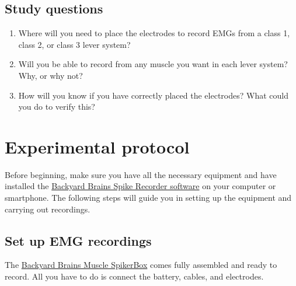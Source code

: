 \documentclass{article}
\begin{document}
\subsection{Study questions}

\begin{enumerate}
\item Where will you need to place the electrodes to record EMGs from a class 1, class 2, or class 3 lever system?
\item Will you be able to record from any muscle you want in each lever system? Why, or why not?
\item How will you know if you have correctly placed the electrodes? What could you do to verify this?
\end{enumerate}

\section{Experimental protocol}

Before beginning, make sure you have all the necessary equipment and have installed the \href{https://backyardbrains.com/products/byb-spike-recorder}{Backyard Brains Spike Recorder software} on your computer or smartphone. The following steps will guide you in setting up the equipment and carrying out recordings.

\subsection{Set up EMG recordings}

The \href{https://backyardbrains.com/products/muscle-spikerbox}{Backyard Brains Muscle SpikerBox} comes fully assembled and ready to record. All you have to do is connect the battery, cables, and electrodes.
\end{document}
